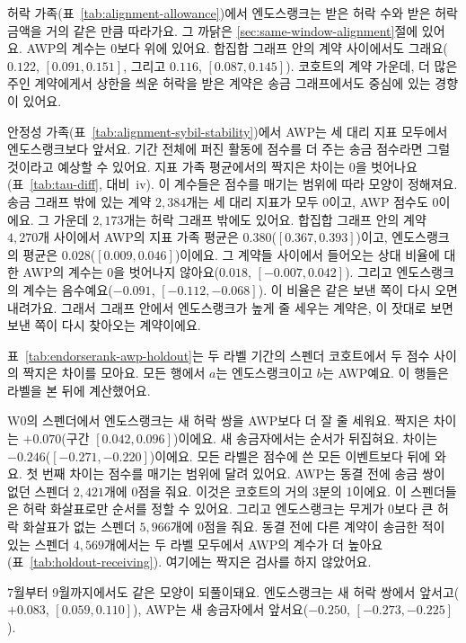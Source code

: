 

허락 가족(표~\ref{tab:alignment-allowance})\label{sub:allowance-family}에서 엔도스랭크는 받은 허락 수와 받은 허락 금액을 거의 같은 만큼 따라가요. 그 까닭은 \ref{sec:same-window-alignment}절에 있어요. AWP의 계수는 0보다 위에 있어요. 합집합 그래프 안의 계약 사이에서도 그래요($0.122$, $[0.091,0.151]$, 그리고 $0.116$, $[0.087,0.145]$). 코호트의 계약 가운데, 더 많은 주인 계약에게서 상한을 씌운 허락을 받은 계약은 송금 그래프에서도 중심에 있는 경향이 있어요.



안정성 가족(표~\ref{tab:alignment-sybil-stability})\label{sub:sybil-family}에서 AWP는 세 대리 지표 모두에서 엔도스랭크보다 앞서요. 기간 전체에 퍼진 활동에 점수를 더 주는 송금 점수라면 그럴 것이라고 예상할 수 있어요. 지표 가족 평균에서의 짝지은 차이는 0을 벗어나요(표~\ref{tab:tau-diff}, 대비~iv). 이 계수들은 점수를 매기는 범위에 따라 모양이 정해져요. 송금 그래프 밖에 있는 계약 $2{,}384$개는 세 대리 지표가 모두 0이고, AWP 점수도 0이에요. 그 가운데 $2{,}173$개는 허락 그래프 밖에도 있어요. 합집합 그래프 안의 계약 $4{,}270$개 사이에서 AWP의 지표 가족 평균은 $0.380$($[0.367,0.393]$)이고, 엔도스랭크의 평균은 $0.028$($[0.009,0.046]$)이에요. 그 계약들 사이에서 들어오는 상대 비율에 대한 AWP의 계수는 0을 벗어나지 않아요($0.018$, $[-0.007,0.042]$). 그리고 엔도스랭크의 계수는 음수예요($-0.091$, $[-0.112,-0.068]$). 이 비율은 같은 보낸 쪽이 다시 오면 내려가요. 그래서 그래프 안에서 엔도스랭크가 높게 줄 세우는 계약은, 이 잣대로 보면 보낸 쪽이 다시 찾아오는 계약이에요.


표~\ref{tab:endorserank-awp-holdout}는 두 라벨 기간의 스펜더 코호트에서 두 점수 사이의 짝지은 차이를 모아요. 모든 행에서 $a$는 엔도스랭크이고 $b$는 AWP예요. 이 행들은 라벨을 본 뒤에 계산했어요.



W0의 스펜더에서 엔도스랭크는 새 허락 쌍을 AWP보다 더 잘 줄 세워요. 짝지은 차이는 $+0.070$(구간 $[0.042,0.096]$)이에요. 새 송금자에서는 순서가 뒤집혀요. 차이는 $-0.246$($[-0.271,-0.220]$)이에요. 모든 라벨은 점수에 쓴 모든 이벤트보다 뒤에 와요. 첫 번째 차이는 점수를 매기는 범위에 달려 있어요. AWP는 동결 전에 송금 쌍이 없던 스펜더 $2{,}421$개에 0점을 줘요. 이것은 코호트의 거의 3분의 1이에요. 이 스펜더들은 허락 화살표로만 순서를 정할 수 있어요. 그리고 엔도스랭크는 무게가 0보다 큰 허락 화살표가 없는 스펜더 $5{,}966$개에 0점을 줘요. 동결 전에 다른 계약이 송금한 적이 있는 스펜더 $4{,}569$개에서는 두 라벨 모두에서 AWP의 계수가 더 높아요(표~\ref{tab:holdout-receiving}). 여기에는 짝지은 검사를 하지 않았어요.

7월부터 9월까지에서도 같은 모양이 되풀이돼요. 엔도스랭크는 새 허락 쌍에서 앞서고($+0.083$, $[0.059,0.110]$), AWP는 새 송금자에서 앞서요($-0.250$, $[-0.273,-0.225]$).
